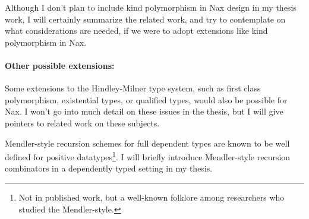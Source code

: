 Although I don't plan to include kind polymorphism in Nax design in
my thesis work, I will certainly summarize the related work, and try to
contemplate on what considerations are needed, if we were to adopt
extensions like kind polymorphism in Nax.

\paragraph{Other possible extensions:}

Some extensions to the Hindley-Milner type system, such as first class
polymorphism, existential types, or qualified types, would also be possible for Nax. I
won't go into much detail on these issues in the thesis, but I will give pointers
to related work on these subjects.

Mendler-style recursion schemes for full dependent types are known to be well
defined for positive datatypes\footnote{Not in published work, but a well-known
folklore among researchers who studied the Mendler-style.}. I will briefly
introduce Mendler-style recursion combinators in a dependently typed setting in my
thesis.

